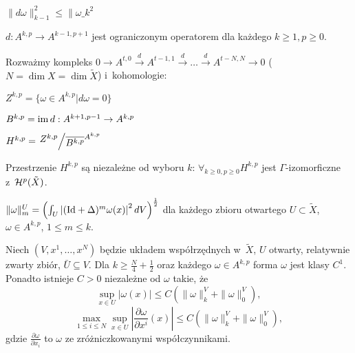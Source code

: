 

 


\begin{stwierdzenie}
	$\| d \omega\|_{k-1}^2 \leq \| \omega \_k^2$
\end{stwierdzenie}

\begin{wniosek}
	$d : A^{k,p} \to A^{k-1, p+1}$ jest ograniczonym operatorem
	dla każdego $k \geq 1, p \geq 0$.
\end{wniosek}

\begin{definicja}
	Rozważmy kompleks
	${0 \to A^{t,0} \xrightarrow d A^{t-1,1} \xrightarrow d \ldots
	\xrightarrow d A^{t-N, N} \to 0}$ (${N = \dim X = \dim \tilde{X}}$)
	i~kohomologie:
	
	$Z^{k,p} = \{ \omega \in A^{k,p} | d\omega = 0\}$
	
	$B^{k,p} = {\mathrm{im}\,} d : A^{k+1, p-1} \to A^{k,p}$
	
	$H^{k,p} = \bigslant{Z^{k,p}}{\overline{B^{k,p}}^{A^{k,p}}}$
\end{definicja}

\begin{stwierdzenie}
	Przestrzenie $H^{k,p}$ są niezależne od wyboru $k$:
	$\forall_{k \geq 0, p \geq 0} H^{k,p}$ jest $\Gamma$-izomorficzne
	z~${\mathcal{H}}^p(\tilde{X})$.
\end{stwierdzenie}

\begin{definicja}
	$\| \omega \|_m^U = \left( \int_U \left|
		({\mathrm{Id}} + \Delta)^m \omega ( x) \right|^2 dV \right)^{\frac12}$
	dla każdego zbioru otwartego ${U \subset \tilde{X}}$, 
	${\omega \in A^{k,p}}$, ${1 \leq m \leq k}$.
\end{definicja}

\begin{lemat}
	Niech $(V, x^1, \ldots, x^N)$ będzie układem współrzędnych
	w~$\tilde{X}$, $U$ otwarty, relatywnie zwarty zbiór,
	$\bar{U} \subseteq V$.
	Dla $k \geq \frac N 4 + \frac 1 2$ oraz każdego $\omega \in A^{k,p}$
	forma $\omega$ jest klasy $C^1$. Ponadto istnieje $C>0$
	niezależne od $\omega$ takie, że
	$$\sup_{x \in U} |\omega(x)| \leq C( \| \omega \|_k^V + 
		\|\omega\|_0^V),$$
	$$\max_{1 \leq i \leq N} \sup_{x \in U}
		\left| \frac{ \partial \omega }{\partial x^i} (x) \right|
		\leq C (\| \omega \|_k^V + \| \omega \|_0^V ),$$
	gdzie $\frac{\partial \omega}{\partial x_i}$ to $\omega$
	ze zróżniczkowanymi współczynnikami.
\end{lemat}

